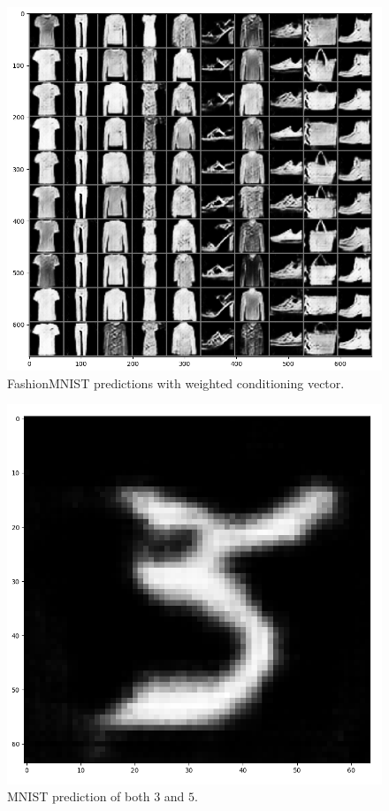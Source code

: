 \documentclass[10pt,twocolumn,letterpaper]{article}
\begin{document}
\begin{figure}[h!t]
   \centering
   \includegraphics[scale=0.39]{images/fashion-weighted.png}
   \caption{FashionMNIST predictions with weighted conditioning vector.}
   \label{fig:fashion-weight}
\end{figure}

\begin{figure}[h!t]
   \centering
   \includegraphics[scale=0.39]{images/gen35.png}
   \caption{MNIST prediction of both $3$ and $5$.}
   \label{fig:mnist-35}
\end{figure}
\end{document}
